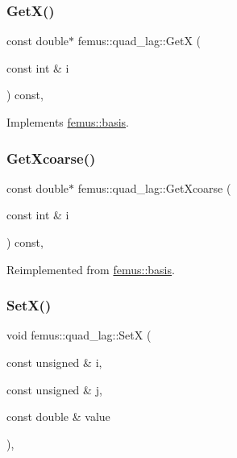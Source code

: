 \subsubsection{\texorpdfstring{Get\+X()}{GetX()}}
{\footnotesize\ttfamily const double$\ast$ femus\+::quad\+\_\+lag\+::\+GetX (\begin{DoxyParamCaption}\item[{const int \&}]{i }\end{DoxyParamCaption}) const\hspace{0.3cm}{\ttfamily [inline]}, {\ttfamily [virtual]}}



Implements \mbox{\hyperlink{classfemus_1_1basis_a00597122bbc75877f1c184f8fce4986c}{femus\+::basis}}.

\mbox{\label{classfemus_1_1quad__lag_a0e07e085178832564a1be9bf1ea95814}} 
\subsubsection{\texorpdfstring{Get\+Xcoarse()}{GetXcoarse()}}
{\footnotesize\ttfamily const double$\ast$ femus\+::quad\+\_\+lag\+::\+Get\+Xcoarse (\begin{DoxyParamCaption}\item[{const int \&}]{i }\end{DoxyParamCaption}) const\hspace{0.3cm}{\ttfamily [inline]}, {\ttfamily [virtual]}}



Reimplemented from \mbox{\hyperlink{classfemus_1_1basis_afcabbbda61ede8f30158fe08ee0a5258}{femus\+::basis}}.

\mbox{\label{classfemus_1_1quad__lag_a0bd8bb0ef4995d4b70b76e5d92c4c3b2}} 
\subsubsection{\texorpdfstring{Set\+X()}{SetX()}}
{\footnotesize\ttfamily void femus\+::quad\+\_\+lag\+::\+SetX (\begin{DoxyParamCaption}\item[{const unsigned \&}]{i,  }\item[{const unsigned \&}]{j,  }\item[{const double \&}]{value }\end{DoxyParamCaption})\hspace{0.3cm}{\ttfamily [inline]}, {\ttfamily [virtual]}}



